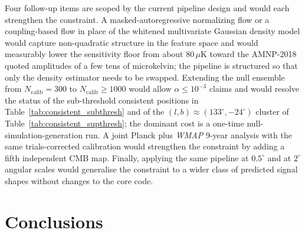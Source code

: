 \documentclass[fleqn,usenatbib]{mnras}
\begin{document}
Four follow-up items are scoped by the current pipeline design and would each strengthen the constraint. A masked-autoregressive normalizing flow \citep{papamakarios_2017} or a coupling-based flow \citep{dinh_2016} in place of the whitened multivariate Gaussian density model would capture non-quadratic structure in the feature space and would measurably lower the sensitivity floor from about $80\,\mu\mathrm{K}$ toward the AMNP-2018 quoted amplitudes of a few tens of microkelvin; the pipeline is structured so that only the density estimator needs to be swapped. Extending the null ensemble from $N_{\text{calib}} = 300$ to $N_{\text{calib}} \ge 1000$ would allow $\alpha \le 10^{-3}$ claims and would resolve the status of the sub-threshold consistent positions in Table~\ref{tab:consistent_subthresh} and of the $(l, b) \approx (133^\circ, -24^\circ)$ cluster of Table~\ref{tab:consistent_supthresh}; the dominant cost is a one-time null-simulation-generation run. A joint Planck plus \emph{WMAP} 9-year \citep{bennett_2013} analysis with the same trials-corrected calibration would strengthen the constraint by adding a fifth independent CMB map. Finally, applying the same pipeline at $0.5^\circ$ and at $2^\circ$ angular scales would generalise the constraint to a wider class of predicted signal shapes without changes to the core code.

\section{Conclusions}\label{sec:conclusion}
\end{document}
